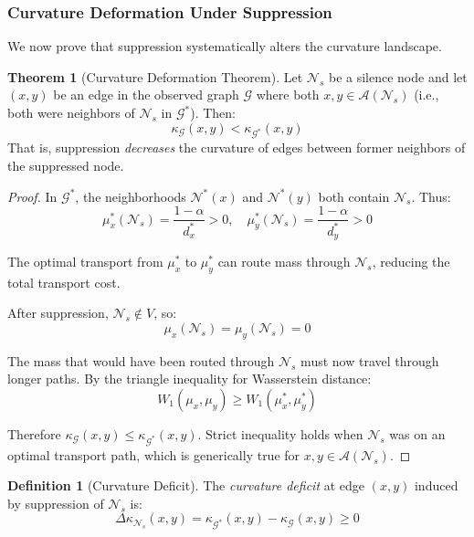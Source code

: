 \documentclass[12pt,a4paper]{article}
\theoremstyle{definition}
\newtheorem{definition}{Definition}[section]
\newtheorem{theorem}{Theorem}[section]
\theoremstyle{remark}
\newcommand{\NS}{\mathcal{N}_s}          %
\newcommand{\CA}{\mathcal{A}}            %
\newcommand{\Graph}{\mathcal{G}}         %
\begin{document}
\subsubsection{Curvature Deformation Under Suppression}

We now prove that suppression systematically alters the curvature landscape.

\begin{theorem}[Curvature Deformation Theorem]
\label{thm:curvature-deformation}
Let $\NS$ be a silence node and let $(x, y)$ be an edge in the observed graph $\Graph$ where both $x, y \in \CA(\NS)$ (i.e., both were neighbors of $\NS$ in $\Graph^*$). Then:
\begin{equation}
    \kappa_{\Graph}(x, y) < \kappa_{\Graph^*}(x, y)
\end{equation}
That is, suppression \emph{decreases} the curvature of edges between former neighbors of the suppressed node.
\end{theorem}

\begin{proof}
In $\Graph^*$, the neighborhoods $\mathcal{N}^*(x)$ and $\mathcal{N}^*(y)$ both contain $\NS$. Thus:
\begin{equation}
    \mu_x^*(\NS) = \frac{1-\alpha}{d_x^*} > 0, \quad \mu_y^*(\NS) = \frac{1-\alpha}{d_y^*} > 0
\end{equation}

The optimal transport from $\mu_x^*$ to $\mu_y^*$ can route mass through $\NS$, reducing the total transport cost.

After suppression, $\NS \notin V$, so:
\begin{equation}
    \mu_x(\NS) = \mu_y(\NS) = 0
\end{equation}

The mass that would have been routed through $\NS$ must now travel through longer paths. By the triangle inequality for Wasserstein distance:
\begin{equation}
    W_1(\mu_x, \mu_y) \geq W_1(\mu_x^*, \mu_y^*)
\end{equation}

Therefore $\kappa_{\Graph}(x,y) \leq \kappa_{\Graph^*}(x,y)$. Strict inequality holds when $\NS$ was on an optimal transport path, which is generically true for $x, y \in \CA(\NS)$.
\end{proof}

\begin{definition}[Curvature Deficit]
The \emph{curvature deficit} at edge $(x,y)$ induced by suppression of $\NS$ is:
\begin{equation}
    \Delta\kappa_{\NS}(x, y) = \kappa_{\Graph^*}(x, y) - \kappa_{\Graph}(x, y) \geq 0
\end{equation}
\end{definition}
\end{document}
